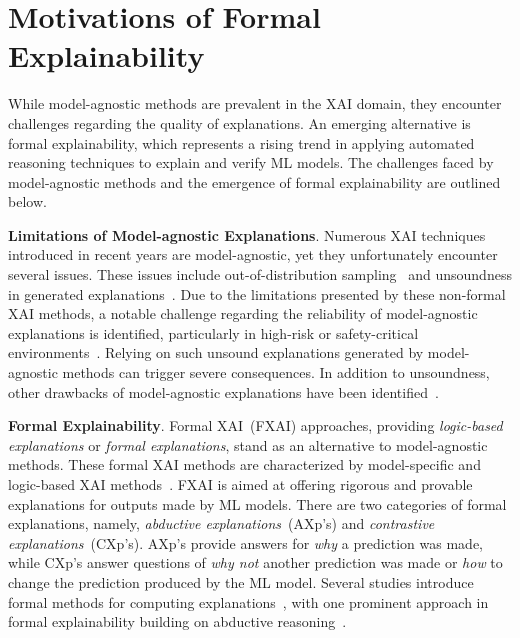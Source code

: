 \section{Motivations of Formal Explainability}

While model-agnostic methods are prevalent in the XAI domain, 
they encounter challenges regarding the quality of explanations. 
%
An emerging alternative is formal explainability, which represents a
rising trend in applying automated reasoning techniques to explain and 
verify ML models.
%
The challenges faced by model-agnostic methods 
and the emergence of formal explainability 
are outlined below.


\textbf{Limitations of Model-agnostic Explanations}.
Numerous XAI techniques introduced in recent years are 
model-agnostic, yet they unfortunately encounter several issues.
%
These issues include out-of-distribution sampling~\cite{lakkaraju-aies20a,lb-aies20,yis-corr23,yfis-corr23}
and unsoundness in generated explanations~\cite{inms-corr19,nsmims-sat19,ignatiev-ijcai20,msi-aaai22}.
%
Due to the limitations presented by these non-formal XAI methods,
a notable challenge regarding the reliability of model-agnostic explanations is identified, 
particularly in high-risk or safety-critical environments~\cite{rudin-nature22,rudin-natmi19,vw-pt21,raai-sp19,dmbt-comp17,hcw-chb21,ms-rw22}.
%
Relying on such unsound explanations generated by model-agnostic methods can trigger severe consequences.
%
In addition to unsoundness, other drawbacks of model-agnostic explanations have been identified~\cite{cgflb-corr19,dbjw-ecai20,kvsf-icml20,jmb-aistats20,hms-corr23,hms-corr23b,hms-corr23c}.

\textbf{Formal Explainability}.
%
Formal XAI~(FXAI) approaches, providing \emph{logic-based explanations} or 
\emph{formal explanations},
stand as an alternative to  model-agnostic methods.
%
These formal XAI methods are characterized by model-specific
and logic-based XAI methods~\cite{ignatiev-ijcai20,msi-aaai22,darwiche-lics23,ms-rw22}.
%
FXAI is aimed at offering rigorous and provable explanations for 
outputs made by ML models.
%
There are two categories of formal explanations, namely,
\emph{abductive explanations}~(AXp’s) and \emph{contrastive explanations}~(CXp’s).
%
AXp's provide answers for \emph{why} a prediction was made, 
while CXp's answer questions of \emph{why not} another prediction was made
or \emph{how} to change the prediction produced by the ML model. 
%
Several studies introduce formal methods for computing explanations~\cite{amgoud-ecsqaru21,ll-clar21,rcblt-ai21,rcbt-kr20,wgh-aies19}, with one prominent
approach in formal explainability building on abductive reasoning~\cite{inms-corr19,inms-aaai19,ignatiev-ijcai20,msgcin-nips20,ims-sat21,msi-aaai22,imsns-ijcai21,hiicams-aaai22,barcelo-nips22,hiims-kr21,hims-aaai23,huang-tacas23,ims-ijcai21,msgcin-icml21,yisnms-aaai23,snimmsv-aaai22,nsmims-sat19}.


